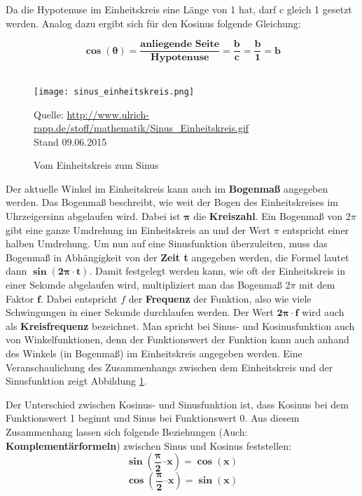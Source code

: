 Da die Hypotenuse im Einheitskreis eine Länge von 1 hat, darf c gleich 1 gesetzt werden.
Analog dazu ergibt sich für den Kosinus folgende Gleichung:

\begin{equation}\bm{\cos(\theta) = \frac{\textbf{anliegende Seite}}{\textbf{Hypotenuse}} = \frac{b}{c} = \frac{b}{1} = b}\end{equation} \cite[s. 22 - 27]{fmtheory} \\

\begin{figure} [ht]
\centering
\texttt{[image: sinus\_einheitskreis.png]}
\caption{Vom Einheitskreis zum Sinus}
\label{fig:unitcircleToSinus}
Quelle: \url{http://www.ulrich-rapp.de/stoff/mathematik/Sinus_Einheitskreis.gif}
\\Stand 09.06.2015
\end{figure}

Der aktuelle Winkel im Einheitskreis kann auch im \textbf{Bogenmaß} angegeben werden. Das Bogenmaß beschreibt, wie weit der Bogen des Einheitskreises im Uhrzeigersinn abgelaufen wird. Dabei ist $\bm{\pi}$ die \textbf{Kreiszahl}. Ein Bogenmaß von $2\pi$ gibt eine ganze Umdrehung im Einheitskreis an und der Wert $\pi$ entspricht einer halben Umdrehung. Um nun auf eine Sinusfunktion überzuleiten, muss das Bogenmaß in Abhängigkeit von der \textbf{Zeit t} angegeben werden, die Formel lautet dann $\bm{\sin(2\pi \cdot t)}$. Damit festgelegt werden kann, wie oft der Einheitskreis in einer Sekunde abgelaufen wird, multipliziert man das Bogenmaß $2\pi$ mit dem Faktor $\bm{f}$. Dabei entspricht $f$ der \textbf{Frequenz} der Funktion, also wie viele Schwingungen in einer Sekunde durchlaufen werden. Der Wert $\bm{2\pi \cdot f}$ wird auch als \textbf{Kreisfrequenz} bezeichnet.
Man spricht bei Sinus- und Kosinusfunktion auch von Winkelfunktionen, denn der Funktionswert der Funktion kann auch anhand des Winkels (in Bogenmaß) im Einheitskreis angegeben werden. 
Eine Veranschaulichung des Zusammenhangs zwischen dem Einheitskreis und der Sinusfunktion zeigt Abbildung \ref{fig:unitcircleToSinus}.

Der Unterschied zwischen Kosinus- und Sinusfunktion ist, dass Kosinus bei dem Funktionswert 1 beginnt und Sinus bei Funktionswert 0. Aus diesem Zusammenhang lassen sich folgende Beziehungen (Auch: \textbf{Komplementärformeln}) zwischen Sinus und Kosinus feststellen:\\

\begin{equation}\bm{\sin(\frac {\pi}{2} – x) =\cos(x)}\end{equation}
\begin{equation}\bm{\cos(\frac {\pi}{2} – x) = \sin(x)}\end{equation}
\cite[s. 218]{matheBuch}

